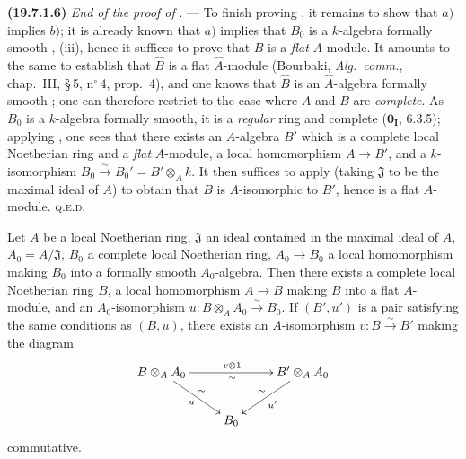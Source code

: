 \medskip
\noindent\textbf{(19.7.1.6)}\enspace
\emph{End of the proof of} . ---
To finish proving , it remains to show that $a)$ implies $b)$; it is already known that $a)$ implies that $B_0$ is a $k$-algebra formally smooth , (iii), hence it suffices to prove that $B$ is a \emph{flat} $A$-module.
It amounts to the same to establish that $\widehat{B}$ is a flat $\widehat{A}$-module (Bourbaki, \emph{Alg.\ comm.}, chap.~III, \S\,5, n$^\circ$\,4, prop.~4), and one knows that $\widehat{B}$ is an $\widehat{A}$-algebra formally smooth ; one can therefore restrict to the case where $A$ and $B$ are \emph{complete}.
As $B_0$ is a $k$-algebra formally smooth, it is a \emph{regular} ring  and complete ($\mathbf{0_I}$, 6.3.5); applying , one sees that there exists an $A$-algebra $B'$ which is a complete local Noetherian ring and a \emph{flat} $A$-module, a local homomorphism $A\to B'$, and a $k$-isomorphism $B_0\xrightarrow{\sim}B_0'=B'\otimes_A k$.
It then suffices to apply  (taking $\mathfrak{J}$ to be the maximal ideal of $A$) to obtain that $B$ is $A$-isomorphic to $B'$, hence is a flat $A$-module. \textsc{q.e.d.}

\begin{theorem}[19.7.2]
\label{0.19.7.2}
Let $A$ be a local Noetherian ring, $\mathfrak{J}$ an ideal contained in the maximal ideal of $A$, $A_0=A/\mathfrak{J}$, $B_0$ a complete local Noetherian ring, $A_0\to B_0$ a local homomorphism making $B_0$ into a formally smooth $A_0$-algebra.
Then there exists a complete local Noetherian ring $B$, a local homomorphism $A\to B$ making $B$ into a \textup{flat} $A$-module, and an $A_0$-isomorphism $u:B\otimes_A A_0\xrightarrow{\sim} B_0$.
If $(B',u')$ is a pair satisfying the same conditions as $(B,u)$, there exists an $A$-isomorphism $v:B\xrightarrow{\sim} B'$ making the diagram
\[
\xymatrix{
  B\otimes_A A_0 \ar[rr]^{v\otimes 1}_{\sim} \ar[dr]^{\sim}_u && B'\otimes_A A_0 \ar[dl]^{u'}_{\sim} \\
  & B_0
}
\]
commutative.
\end{theorem}

